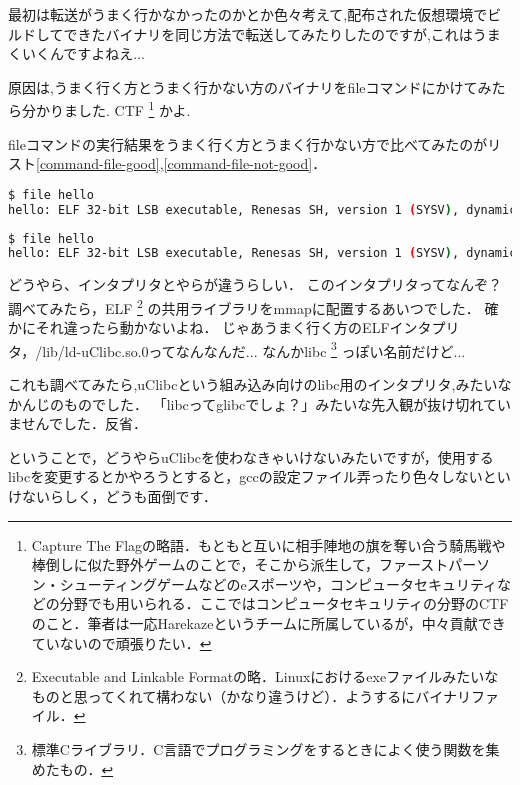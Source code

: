 最初は転送がうまく行かなかったのかとか色々考えて,配布された仮想環境でビルドしてできたバイナリを同じ方法で転送してみたりしたのですが,これはうまくいくんですよねえ...

原因は,うまく行く方とうまく行かない方のバイナリをfileコマンドにかけてみたら分かりました.
CTF
\footnote{Capture The Flagの略語．もともと互いに相手陣地の旗を奪い合う騎馬戦や棒倒しに似た野外ゲームのことで，そこから派生して，ファーストパーソン・シューティングゲームなどのeスポーツや，コンピュータセキュリティなどの分野でも用いられる．ここではコンピュータセキュリティの分野のCTFのこと．筆者は一応Harekazeというチームに所属しているが，中々貢献できていないので頑張りたい．}
かよ.

fileコマンドの実行結果をうまく行く方とうまく行かない方で比べてみたのがリスト\ref{command-file-good},\ref{command-file-not-good}．

\begin{lstlisting}[language=bash,label=command-file-good,caption=うまく行く方]
$ file hello
hello: ELF 32-bit LSB executable, Renesas SH, version 1 (SYSV), dynamically linked, interpreter /lib/ld-uClibc.so.0, not stripped
\end{lstlisting}

\begin{lstlisting}[language=bash,label=command-file-not-good,caption=うまく行かない方]
$ file hello
hello: ELF 32-bit LSB executable, Renesas SH, version 1 (SYSV), dynamically linked, interpreter /lib/ld-linux.so.2, BuildID[sha1]=..., for GNU/Linux 3.2.0, not stripped
\end{lstlisting}

どうやら、インタプリタとやらが違うらしい．
このインタプリタってなんぞ？
調べてみたら，ELF
\footnote{Executable and Linkable Formatの略．Linuxにおけるexeファイルみたいなものと思ってくれて構わない（かなり違うけど）．ようするにバイナリファイル．}
の共用ライブラリをmmapに配置するあいつでした．
確かにそれ違ったら動かないよね．
じゃあうまく行く方のELFインタプリタ，/lib/ld-uClibc.so.0ってなんなんだ...
なんかlibc
\footnote{標準Cライブラリ．C言語でプログラミングをするときによく使う関数を集めたもの．}
っぽい名前だけど...

これも調べてみたら,uClibcという組み込み向けのlibc用のインタプリタ,みたいなかんじのものでした．
「libcってglibcでしょ？」みたいな先入観が抜け切れていませんでした．反省．

ということで，どうやらuClibcを使わなきゃいけないみたいですが，使用するlibcを変更するとかやろうとすると，gccの設定ファイル弄ったり色々しないといけないらしく，どうも面倒です．

